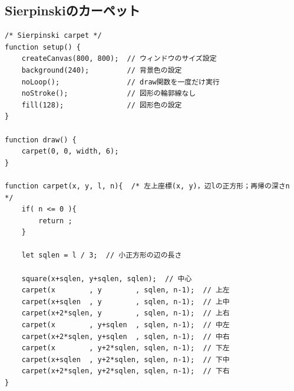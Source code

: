 \documentclass[dvipdfmx]{jsarticle}
\theoremstyle{definition}
\begin{document}
\subsection{Sierpinskiのカーペット}  \label{subsec_code_carpet}
\begin{lstlisting}[caption=Sierpinskiのカーペット, label=code_carpet_all]
/* Sierpinski carpet */
function setup() {
    createCanvas(800, 800);  // ウィンドウのサイズ設定
    background(240);         // 背景色の設定
    noLoop();                // draw関数を一度だけ実行
    noStroke();              // 図形の輪郭線なし
    fill(128);               // 図形色の設定
}

function draw() {
    carpet(0, 0, width, 6);
}

function carpet(x, y, l, n){  /* 左上座標(x, y)，辺lの正方形；再帰の深さn */
    if( n <= 0 ){
        return ;
    }

    let sqlen = l / 3;  // 小正方形の辺の長さ

    square(x+sqlen, y+sqlen, sqlen);  // 中心
    carpet(x        , y        , sqlen, n-1);  // 上左
    carpet(x+sqlen  , y        , sqlen, n-1);  // 上中
    carpet(x+2*sqlen, y        , sqlen, n-1);  // 上右
    carpet(x        , y+sqlen  , sqlen, n-1);  // 中左
    carpet(x+2*sqlen, y+sqlen  , sqlen, n-1);  // 中右
    carpet(x        , y+2*sqlen, sqlen, n-1);  // 下左
    carpet(x+sqlen  , y+2*sqlen, sqlen, n-1);  // 下中
    carpet(x+2*sqlen, y+2*sqlen, sqlen, n-1);  // 下右
}
\end{lstlisting}
\clearpage

\end{document}
